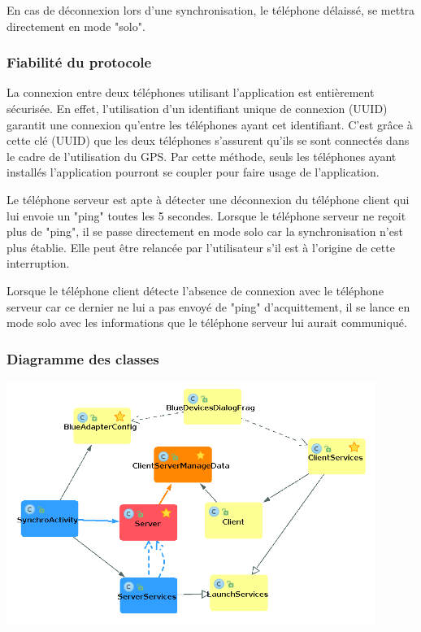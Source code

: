 En cas de déconnexion lors d'une synchronisation, le téléphone délaissé, se mettra directement en mode "solo".
 

\subsubsection{Fiabilité du protocole}
La connexion entre deux téléphones utilisant l'application est entièrement sécurisée. En effet, l'utilisation d'un identifiant unique de connexion (UUID) garantit une connexion qu'entre les téléphones ayant cet identifiant. C'est grâce à cette clé (UUID) que les deux téléphones s'assurent qu'ils se sont connectés dans le cadre de l'utilisation du GPS.
Par cette méthode, seuls les téléphones ayant installés l'application pourront se coupler pour faire usage de l'application.

Le téléphone serveur est apte à détecter une déconnexion du téléphone client qui lui envoie un "ping" toutes les 5 secondes. Lorsque le téléphone serveur ne reçoit plus de "ping", il se passe directement en mode solo car la synchronisation n'est plus établie. Elle peut être relancée par l'utilisateur s'il est à l'origine de cette interruption.

Lorsque le téléphone client détecte l'absence de connexion avec le téléphone serveur car ce dernier ne lui a pas envoyé de "ping" d'acquittement, il se lance en mode solo avec les informations que le téléphone serveur lui aurait communiqué.

\subsubsection{Diagramme des classes}
\begin{center}
\includegraphics[height=300px]{Assets/synchroUML.png}
\label{synchroUML}
\end{center}

